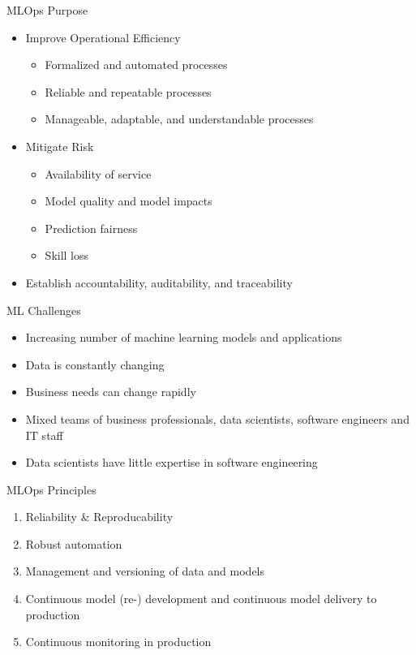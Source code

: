\documentclass[ignorenonframetext,xcolor=x11names]{beamer}
\begin{document}
\begin{frame}[label=full]{MLOps Purpose}
\begin{itemize}
\item Improve Operational Efficiency
    \begin{itemize}
        \item Formalized and automated processes
        \item Reliable and repeatable processes
        \item Manageable, adaptable, and understandable processes
    \end{itemize}
\item Mitigate Risk
	\begin{itemize}
	   \item Availability of service
	   \item Model quality and model impacts
	   \item Prediction fairness
	   \item Skill loss
	\end{itemize}
\item Establish accountability, auditability, and traceability
\end{itemize}
\end{frame}

\begin{frame}[label=full]{ML Challenges}

\begin{itemize}
  \item Increasing number of machine learning models and applications
  \item Data is constantly changing
  \item Business needs can change rapidly
  \item Mixed teams of business professionals, data scientists, software engineers and IT staff
  \item Data scientists have little expertise in software engineering
\end{itemize}
\end{frame}

\begin{frame}[label=full]{MLOps Principles}
\begin{enumerate}
  \item Reliability \& Reproducability
  \item Robust automation
  \item Management and versioning of data and models
  \item Continuous model (re-) development and continuous model delivery to production
  \item Continuous monitoring in production
\end{enumerate}
\end{frame}
\end{document}
